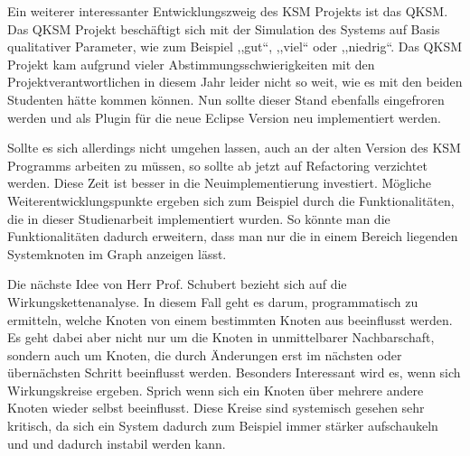 Ein weiterer interessanter Entwicklungszweig des KSM Projekts ist das QKSM. Das QKSM Projekt beschäftigt sich mit der Simulation des Systems auf Basis qualitativer Parameter, wie zum Beispiel ,,gut``, ,,viel`` oder ,,niedrig``. Das QKSM Projekt kam aufgrund vieler Abstimmungsschwierigkeiten mit den Projektverantwortlichen in diesem Jahr leider nicht so weit, wie es mit den beiden Studenten hätte kommen können. Nun sollte dieser Stand ebenfalls eingefroren werden und als Plugin für die neue Eclipse Version neu implementiert werden.

Sollte es sich allerdings nicht umgehen lassen, auch an der alten Version des KSM Programms arbeiten zu müssen, so sollte ab jetzt auf Refactoring verzichtet werden. Diese Zeit ist besser in die Neuimplementierung investiert. Mögliche Weiterentwicklungspunkte ergeben sich zum Beispiel durch die Funktionalitäten, die in dieser Studienarbeit implementiert wurden. So könnte man die Funktionalitäten dadurch erweitern, dass man nur die in einem Bereich liegenden Systemknoten im Graph anzeigen lässt. 

Die nächste Idee von Herr Prof. Schubert bezieht sich auf die Wirkungskettenanalyse. In diesem Fall geht es darum, programmatisch zu ermitteln, welche Knoten von einem bestimmten Knoten aus beeinflusst werden. Es geht dabei aber nicht nur um die Knoten in unmittelbarer Nachbarschaft, sondern auch um Knoten, die durch Änderungen erst im nächsten oder übernächsten Schritt beeinflusst werden. Besonders Interessant wird es, wenn sich Wirkungskreise ergeben. Sprich wenn sich ein Knoten über mehrere andere Knoten wieder selbst beeinflusst. Diese Kreise sind systemisch gesehen sehr kritisch, da sich ein System dadurch zum Beispiel immer stärker aufschaukeln und und dadurch instabil werden kann.